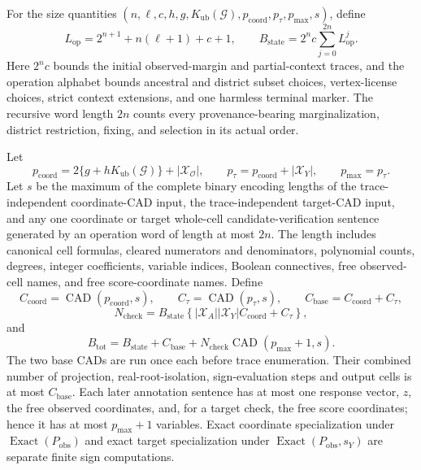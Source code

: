 For the size quantities \((n,\ell,c,h,g,K_{\mathrm{ub}}(\mathcal G),p_{\mathrm{coord}},p_{\tau},p_{\max},s)\), define
\[
L_{\mathrm{op}}=2^{n+1}+n(\ell+1)+c+1,
\qquad
B_{\mathrm{state}}=2^n c\sum_{j=0}^{2n}L_{\mathrm{op}}^j.
\]
Here \(2^n c\) bounds the initial observed-margin and partial-context traces, and the operation alphabet bounds ancestral and district subset choices, vertex-license choices, strict context extensions, and one harmless terminal marker. The recursive word length \(2n\) counts every provenance-bearing marginalization, district restriction, fixing, and selection in its actual order.

Let
\[
p_{\mathrm{coord}}
=2\{g+hK_{\mathrm{ub}}(\mathcal G)\}+|\mathcal X_{\mathcal O}|,
\qquad
p_{\tau}=p_{\mathrm{coord}}+|\mathcal X_Y|,
\qquad
p_{\max}=p_{\tau}.
\]
Let \(s\) be the maximum of the complete binary encoding lengths of the trace-independent coordinate-CAD input, the trace-independent target-CAD input, and any one coordinate or target whole-cell candidate-verification sentence generated by an operation word of length at most \(2n\). The length includes canonical cell formulas, cleared numerators and denominators, polynomial counts, degrees, integer coefficients, variable indices, Boolean connectives, free observed-cell names, and free score-coordinate names. Define
\[
C_{\mathrm{coord}}=\operatorname{CAD}(p_{\mathrm{coord}},s),
\qquad
C_{\tau}=\operatorname{CAD}(p_{\tau},s),
\qquad
C_{\mathrm{base}}=C_{\mathrm{coord}}+C_{\tau},
\]
\[
N_{\mathrm{check}}
=B_{\mathrm{state}}
\left\{|\mathcal X_A||\mathcal X_Y|C_{\mathrm{coord}}+C_{\tau}\right\},
\]
and
\[
B_{\mathrm{tot}}
=B_{\mathrm{state}}+C_{\mathrm{base}}
+N_{\mathrm{check}}\operatorname{CAD}(p_{\max}+1,s).
\]
The two base CADs are run once each before trace enumeration. Their combined number of projection, real-root-isolation, sign-evaluation steps and output cells is at most \(C_{\mathrm{base}}\). Each later annotation sentence has at most one response vector, \(z\), the free observed coordinates, and, for a target check, the free score coordinates; hence it has at most \(p_{\max}+1\) variables. Exact coordinate specialization under \(\operatorname{Exact}(P_{\mathrm{obs}})\) and exact target specialization under \(\operatorname{Exact}(P_{\mathrm{obs}},s_Y)\) are separate finite sign computations.